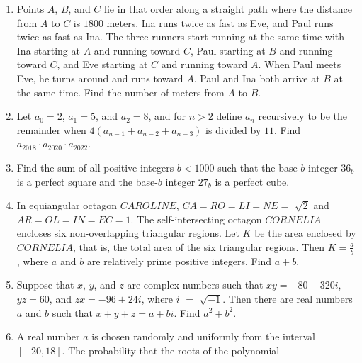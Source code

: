 \documentclass{article}
\begin{document}
\begin{enumerate}[label=\arabic*., itemsep=0.5em]
\item Points \(A\), \(B\), and \(C\) lie in that order along a straight path where the distance from \(A\) to \(C\) is \(1800\) meters. Ina runs twice as fast as Eve, and Paul runs twice as fast as Ina. The three runners start running at the same time with Ina starting at \(A\) and running toward \(C\), Paul starting at \(B\) and running toward \(C\), and Eve starting at \(C\) and running toward \(A\). When Paul meets Eve, he turns around and runs toward \(A\). Paul and Ina both arrive at \(B\) at the same time. Find the number of meters from \(A\) to \(B\).\par \vspace{0.5em}\item Let \(a_{0} = 2\), \(a_{1} = 5\), and \(a_{2} = 8\), and for \(n > 2\) define \(a_{n}\) recursively to be the remainder when \(4(a_{n-1} + a_{n-2} + a_{n-3})\) is divided by \(11\). Find \(a_{2018} \cdot a_{2020} \cdot a_{2022}\).\par \vspace{0.5em}\item Find the sum of all positive integers \(b < 1000\) such that the base-\(b\) integer \(36_{b}\) is a perfect square and the base-\(b\) integer \(27_{b}\) is a perfect cube.\par \vspace{0.5em}\item In equiangular octagon \(CAROLINE\), \(CA = RO = LI = NE =\) \(\sqrt{2}\) and \(AR = OL = IN = EC = 1\). The self-intersecting octagon \(CORNELIA\) encloses six non-overlapping triangular regions. Let \(K\) be the area enclosed by \(CORNELIA\), that is, the total area of the six triangular regions. Then \(K = \frac{a}{b}\), where \(a\) and \(b\) are relatively prime positive integers. Find \(a + b\).\par \vspace{0.5em}\item Suppose that \(x\), \(y\), and \(z\) are complex numbers such that \(xy = -80 - 320i\), \(yz = 60\), and \(zx = -96 + 24i\), where \(i\) \(=\) \(\sqrt{-1}\). Then there are real numbers \(a\) and \(b\) such that \(x + y + z = a + bi\). Find \(a^2 + b^2\).\par \vspace{0.5em}\item A real number \(a\) is chosen randomly and uniformly from the interval \([-20, 18]\). The probability that the roots of the polynomial



\end{enumerate}
\end{document}
